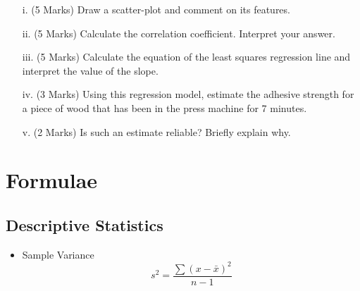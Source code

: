 \begin{itemize}
\item[i.](5 Marks) Draw a scatter-plot and comment on its features.
\item[ii.](5 Marks) Calculate the correlation coefficient. Interpret your answer.
\item[iii.](5 Marks) Calculate the equation of the least squares regression line and interpret the value of the slope.
\item[iv.](3 Marks) Using this regression model, estimate the adhesive strength for a piece of wood that has been in the press machine for 7 minutes.
\item[v.](2 Marks) Is such an estimate reliable? Briefly explain why.
\end{itemize}



\newpage
\section*{Formulae}
\subsection*{Descriptive Statistics}
\begin{itemize}
\item Sample Variance
\begin{equation*}
s^2 = \frac{\sum (x-\bar{x})^2}{n-1}
\end{equation*}
\end{itemize}
